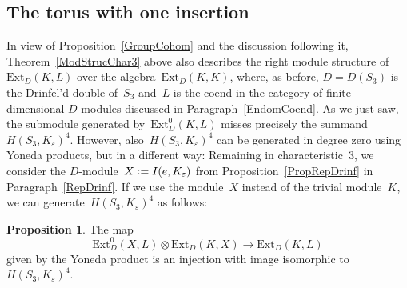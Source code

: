 \documentclass[12pt]{article}
\theoremstyle{definition}
\newtheorem{Proposition}[Satz]{Proposition}
\theoremstyle{break}
\newcommand{\Ext}{\mathrm{Ext}}
\renewcommand{\1}{\mathbbm{1}}
\newcommand{\ot}{\mathbin{\otimes}}
\newcommand{\deq}{\vcentcolon =}
\begin{document}
\subsection{The torus with one insertion} \label{TorIns}
In view of Proposition~\ref{GroupCohom} and the discussion following it, Theorem~\ref{ModStrucChar3} above also describes the right module structure of~$\Ext_D(K, L)$ over the algebra~$\Ext_D(K, K)$, where, as before, $D=D(S_3)$ is the Drinfel'd double of~$S_3$ and~$L$ is the coend in the category of finite-dimensional $D$-modules discussed in Paragraph~\ref{EndomCoend}. As we just saw, the submodule generated by~$\Ext^0_D(K, L)$ misses precisely the summand~$H(S_3, K_\varepsilon)^4$. However, also~$H(S_3, K_\varepsilon)^4$ can be generated in degree zero using Yoneda products, but in a different way: Remaining in characteristic~$3$, we consider the $D$-module~\mbox{$X \deq I(e, K_\varepsilon)$} from Proposition~\ref{PropRepDrinf} in Paragraph~\ref{RepDrinf}. If we use the module~$X$ instead of the trivial module~$K$, we can generate~$H(S_3, K_\varepsilon)^4$ as follows:
\begin{Proposition} \label{GenX}
The map
\[\Ext^0_D(X, L) \ot \Ext_D(K, X) \to \Ext_D(K, L)\]
given by the Yoneda product is an injection with image isomorphic to~$H(S_3, K_\varepsilon)^4$.
\end{Proposition}
\end{document}
